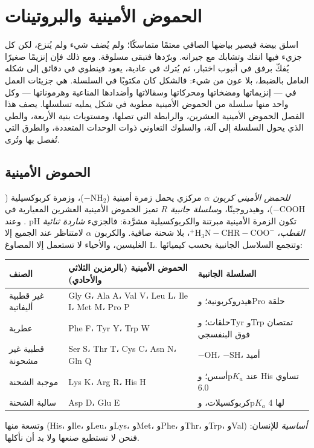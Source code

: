 \chapter{الحموض الأمينية والبروتينات}\label{ch:b1:proteins}

اسلق بيضة فيصير بياضها الصافي معتمًا متماسكًا؛ ولم يُضف شيء ولم
يُنزع، لكن كل جزيء  فيها انفك وتشابك مع جيرانه. وبرّدها فتبقى
مسلوقة. ومع ذلك فإن إنزيمًا صغيرًا يُفكّ برفق في أنبوب اختبار، ثم
يُترك في  عادية، يعود فينطوي في دقائق إلى شكله العامل بالضبط،
بلا عون من شيء: فالشكل كان مكتوبًا في السلسلة.  هي جزيئات
العمل في  --- إنزيماتها ومضخاتها ومحركاتها وسقالاتها وأضدادها
المناعية وهرموناتها --- وكل واحد منها سلسلة من الحموض الأمينية مطوية
في شكل يمليه تسلسلها. يصف هذا الفصل الحموض الأمينية العشرين، والرابطة
التي تصلها، ومستويات بنية  الأربعة، والطي الذي يحول السلسلة
إلى آلة، والسلوك التعاوني  ذوات الوحدات المتعددة، والطرق
التي تُفصل بها  وتُرى.

\section{الحموض الأمينية}

\begin{definition}\label{def:b1:proteins:aminoacid}
\emph{للحمض الأميني} \emph{كربون $\alpha$} مركزي
يحمل زمرة أمينية ($-\mathrm{NH_2}$)، وزمرة كربوكسيلية
($-\mathrm{COOH}$)، وهيدروجينًا، و\emph{سلسلة جانبية}
$R$ تميز الحموض الأمينية العشرين المعيارية في . وعند pH
 تكون الزمرة الأمينية مبرتنة والكربوكسيلية مشرَّدة: فالجزيء
\emph{شاردة ثنائية القطب}،
$\mathrm{^+H_3N{-}CHR{-}COO^-}$، بلا شحنة صافية. والكربون $\alpha$
لامتناظر عند الجميع إلا الغليسين، والأحياء لا تستعمل إلا المصاوغ L.
وتتجمع السلاسل الجانبية بحسب كيميائها:
\begin{center}
\footnotesize
\begin{tabular}{lll}
\hline
الصنف & الحموض الأمينية (بالرمزين الثلاثي والأحادي) & السلسلة الجانبية \\
\hline
غير قطبية أليفاتية & Gly G، Ala A، Val V، Leu L، Ile I، Met M، Pro P & هيدروكربونية؛ وPro حلقة \\
عطرية & Phe F، Tyr Y، Trp W & حلقات؛ وTyr وTrp تمتصان فوق البنفسجي \\
قطبية غير مشحونة & Ser S، Thr T، Cys C، Asn N، Gln Q & $-$OH، $-$SH، أميد \\
موجبة الشحنة & Lys K، Arg R، His H & أسس؛ وp$K_a$ عند His تساوي 6.0 \\
سالبة الشحنة & Asp D، Glu E & كربوكسيلات، وp$K_a$ لها 4 \\
\hline
\end{tabular}
\end{center}
وتسعة منها (His، وIle، وLeu، وLys، وMet، وPhe، وThr، وTrp، وVal)
\emph{أساسية} للإنسان: فنحن لا نستطيع صنعها ولا بد أن نأكلها.
\end{definition}

